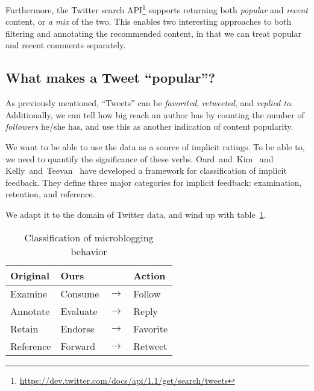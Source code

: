 Furthermore, the Twitter search API\footnote{\url{https://dev.twitter.com/docs/api/1.1/get/search/tweets}} supports returning both \emph{popular} and \emph{recent} content, or \emph{a mix} of the two.
This enables two interesting approaches to both filtering and annotating the recommended content, in that we can treat popular and recent comments separately.

\subsection{What makes a Tweet ``popular''?}

As previously mentioned, ``Tweets'' can be \emph{favorited}, \emph{retweeted}, and \emph{replied to}.
Additionally, we can tell how big reach an author has by counting the number of \emph{followers} he/she has, and use this as another indication of content popularity.

We want to be able to use the data as a source of implicit ratings. To be able to, we need to quantify the significance of these verbs.
Oard~and~Kim~\cite{Oard98implicitfeedback,Oard01modelinginformation} and Kelly~and~Teevan~\cite{Kelly03implicitfeedback} have developed a framework for classification of implicit feedback.
They define three major categories for implicit feedback: examination, retention, and reference.

We adapt it to the domain of Twitter data, and wind up with table~\ref{tab:behavior_class}.

\begin{table}[h]
  \begin{center}
    \begin{tabular}{|llcl|}
      \hline
      \textbf{Original} & \textbf{Ours} & & \textbf{Action} \\
      \hline
      Examine   & Consume  & $\rightarrow$ & Follow \\
      \hline
      Annotate  & Evaluate & $\rightarrow$ & Reply \\
      \hline
      Retain    & Endorse  & $\rightarrow$ & Favorite \\
      \hline
      Reference & Forward  & $\rightarrow$ & Retweet \\
      \hline
    \end{tabular}
  \end{center}
  \caption{Classification of microblogging behavior}
  \label{tab:behavior_class}
\end{table}


